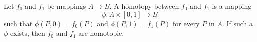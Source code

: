 Let $f_0$ and $f_1$ be mappings $A \to B$. A homotopy between $f_0$ and $f_1$ is a mapping
$$\phi: A \times [0, 1] \to B$$
such that $\phi(P, 0) = f_0(P)$ and $\phi(P, 1) = f_1(P)$ for every $P$ in $A$. If such a $\phi$ exists, then $f_0$ and $f_1$ are homotopic.
